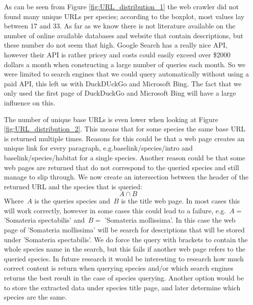 \documentclass[a4paper, 12pt, oneside]{book} %
\begin{document}
As can be seen from Figure \ref{fig:URL_distribution_1} the web crawler did not found many unique URLs per species; according to the boxplot, most values lay between 17 and 33.
As far as we know there is not literature available on the number of online available databases and website that contain descriptions, but these number do not seem that high.
Google Search has a really nice API, however their API is rather pricey and costs could easily exceed over \$2000 dollars a month when constructing a large number of queries each month. 
So we were limited to search engines that we could query automatically without using a paid API, this left us with DuckDUckGo and Microsoft Bing.
The fact that we only used the first page of DuckDuckGo and Microsoft Bing will have a large influence on this.




The number of unique base URLs is even lower when looking at Figure \ref{fig:URL_distribution_2}.
This means that for some species the same base URL is returned multiple times. 
Reasons for this could be that a web page creates an unique link for every paragraph, e.g.baselink/species/intro and baselink/species/habitat for a single species.
Another reason could be that some web pages are returned that do not correspond to the queried species and still manage to slip through.
We now create an intersection between the header of the returned URL and the species that is queried:
\begin{equation} \label{eq:intersection}
    ~A \cap B
\end{equation}
Where~$A$ is the queries species and~$B$ is the title web page.
In most cases this will work correctly, however in some cases this could lead to a failure, e.g.~$A = $ 'Somateria spectabilis' and~$B = $ 'Somateria mollissima'.
In this case the web page of 'Somateria mollissima' will be search for descriptions that will be stored under 'Somateria spectabilis'. 
We do force the query with brackets to contain the whole species name in the search, but this fails if another web page refers to the queried species.
In future research it would be interesting to research how much correct content is return when querying species and/or which search engines returns the best result in the case of species querying.
Another option would be to store the extracted data under species title page, and later determine which species are the same.
\end{document}
